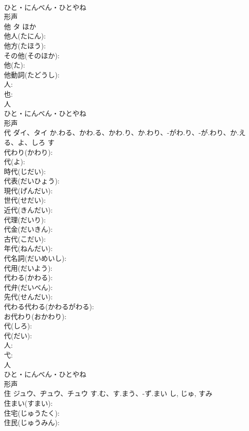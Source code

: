 \documentclass[8pt]{extreport}
\begin{document}
\begin{CJK}{UTF8}{min}
\\	ひと・にんべん・ひとやね	
\\	形声 
\\	他	タ	ほか		
\\	他人(たにん): 
\\	他方(たほう): 
\\	その他(そのほか): 
\\	他(た): 
\\	他動詞(たどうし): 
\\	人: 
\\	也: 
\\	人	
\\	ひと・にんべん・ひとやね	
\\	形声 
\\	代	ダイ、タイ	か.わる、かわ.る、かわ.り、か.わり、-がわ.り、-が.わり、か.える、よ、しろ	す	
\\	代わり(かわり): 
\\	代(よ): 
\\	時代(じだい): 
\\	代表(だいひょう): 
\\	現代(げんだい): 
\\	世代(せだい): 
\\	近代(きんだい): 
\\	代理(だいり): 
\\	代金(だいきん): 
\\	古代(こだい): 
\\	年代(ねんだい): 
\\	代名詞(だいめいし): 
\\	代用(だいよう): 
\\	代わる(かわる): 
\\	代弁(だいべん): 
\\	先代(せんだい): 
\\	代わる代わる(かわるがわる): 
\\	お代わり(おかわり): 
\\	代(しろ): 
\\	代(だい): 
\\	人: 
\\	弋: 
\\	人	
\\	ひと・にんべん・ひとやね	
\\	形声 
\\	住	ジュウ、ヂュウ、チュウ	す.む、す.まう、-ず.まい	し, じゅ, すみ	
\\	住まい(すまい): 
\\	住宅(じゅうたく): 
\\	住民(じゅうみん): 

\end{CJK}
\end{document}
